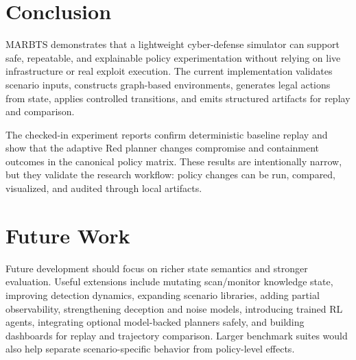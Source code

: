 \documentclass[conference]{IEEEtran}
\begin{document}
\section{Conclusion}
MARBTS demonstrates that a lightweight cyber-defense simulator can support safe, repeatable, and explainable policy experimentation without relying on live infrastructure or real exploit execution. The current implementation validates scenario inputs, constructs graph-based environments, generates legal actions from state, applies controlled transitions, and emits structured artifacts for replay and comparison.

The checked-in experiment reports confirm deterministic baseline replay and show that the adaptive Red planner changes compromise and containment outcomes in the canonical policy matrix. These results are intentionally narrow, but they validate the research workflow: policy changes can be run, compared, visualized, and audited through local artifacts.

\section{Future Work}
Future development should focus on richer state semantics and stronger evaluation. Useful extensions include mutating scan/monitor knowledge state, improving detection dynamics, expanding scenario libraries, adding partial observability, strengthening deception and noise models, introducing trained RL agents, integrating optional model-backed planners safely, and building dashboards for replay and trajectory comparison. Larger benchmark suites would also help separate scenario-specific behavior from policy-level effects.
\end{document}
